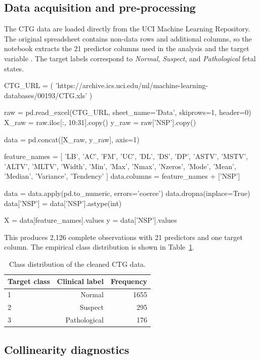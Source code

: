 \subsection{Data acquisition and pre-processing}

The CTG data are loaded directly from the UCI Machine Learning Repository. The
original spreadsheet contains non-data rows and additional columns, so the
notebook extracts the 21 predictor columns used in the analysis and the target
variable . The target labels correspond to \emph{Normal},
\emph{Suspect}, and \emph{Pathological} fetal states.
%
\begin{Code}
CTG_URL = (
    'https://archive.ics.uci.edu/ml/machine-learning-databases/00193/CTG.xls'
)

raw = pd.read_excel(CTG_URL, sheet_name='Data', skiprows=1, header=0)
X_raw = raw.iloc[:, 10:31].copy()
y_raw = raw['NSP'].copy()

data = pd.concat([X_raw, y_raw], axis=1)

feature_names = [
    'LB', 'AC', 'FM', 'UC', 'DL', 'DS', 'DP', 'ASTV', 'MSTV', 'ALTV',
    'MLTV', 'Width', 'Min', 'Max', 'Nmax', 'Nzeros', 'Mode', 'Mean',
    'Median', 'Variance', 'Tendency'
]
data.columns = feature_names + ['NSP']

data = data.apply(pd.to_numeric, errors='coerce')
data.dropna(inplace=True)
data['NSP'] = data['NSP'].astype(int)

X = data[feature_names].values
y = data['NSP'].values
\end{Code}
%
This produces 2,126 complete observations with 21 predictors and one target
column. The empirical class distribution is shown in Table~\ref{tab:ctg-class}.

\begin{table}[t!]
\centering
\begin{tabular}{lrr}
\hline
Target class & Clinical label & Frequency \\ \hline
1 & Normal & 1655 \\
2 & Suspect & 295 \\
3 & Pathological & 176 \\ \hline
\end{tabular}
\caption{\label{tab:ctg-class} Class distribution of the cleaned CTG data.}
\end{table}

\subsection{Collinearity diagnostics}

